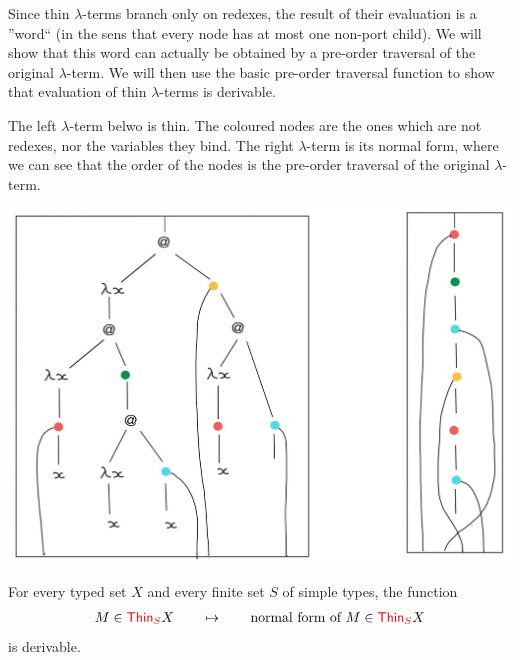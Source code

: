 Since thin $\lambda$-terms branch only on redexes, the result of their evaluation is a ''word`` (in the sens that every node has at most one non-port child).  We will show that this word can actually be obtained by a pre-order traversal of the original $\lambda$-term. We will then use the basic pre-order traversal  function to show that evaluation of thin $\lambda$-terms is derivable. 

The left $\lambda$-term belwo is thin. The coloured nodes are the ones which are not redexes, nor the variables they bind. The right $\lambda$-term is its normal form,  where we can see that the order of the nodes is the pre-order traversal of the original $\lambda$-term.  
\begin{center}
		\includegraphics[scale=.15]{MyPic10.jpg}
		\end{center}

\begin{proposition}\label{prop:EvaluateThin}
 For every typed set $X$ and every finite set $S$ of simple types, the function 
    \begin{align*}
        M \in  {\color{red}{\mathsf{Thin}_{S}}} X \qquad \mapsto \qquad \text{normal form of $M$} \in  {\color{red}{\mathsf{Thin}_{S}}} X
    \end{align*}
    is derivable.
\end{proposition}

